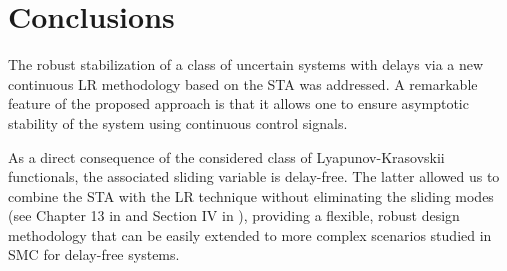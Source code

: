 \documentclass[onecolumn]{IEEEtran}
\begin{document}
%	
%	

\section{Conclusions}
\label{sec:conc}

The robust stabilization of a class of uncertain systems with delays via a  new continuous LR methodology based on the STA {was addressed.} A remarkable feature of the proposed approach is that it allows one to  ensure asymptotic stability of the system {using continuous control signals. } 

As a direct consequence of the considered class of Lyapunov-Krasovskii functionals, the associated sliding variable is delay-free. The latter allowed us to combine the STA with the LR technique without eliminating the sliding modes (see Chapter 13 in \cite{Perruquetti2002} {and Section IV in \cite{EfimovAleksandrov2020})}, providing a flexible, robust design methodology that can be easily extended to more complex scenarios studied in SMC for {delay-free}  systems.
\end{document}
